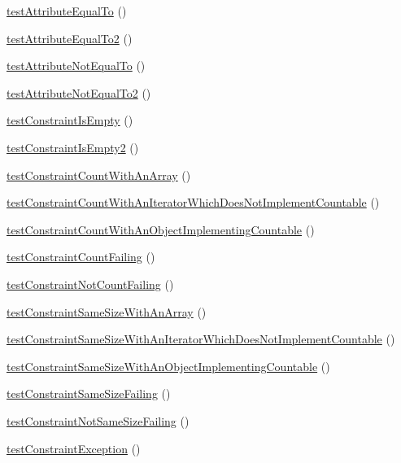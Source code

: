 \begin{DoxyCompactItemize}
\mbox{\hyperlink{class_framework___constraint_test_abf452e33aa93de00c9b9281c2d311656}{test\+Attribute\+Equal\+To}} ()
\item 
\mbox{\hyperlink{class_framework___constraint_test_a63db5364eb96b4d22b7770f102070f93}{test\+Attribute\+Equal\+To2}} ()
\item 
\mbox{\hyperlink{class_framework___constraint_test_a489daffc2853b460aa4ddd7de8d5f570}{test\+Attribute\+Not\+Equal\+To}} ()
\item 
\mbox{\hyperlink{class_framework___constraint_test_a6cd69ee32a47cdb697f4b62ee9c960b9}{test\+Attribute\+Not\+Equal\+To2}} ()
\item 
\mbox{\hyperlink{class_framework___constraint_test_a72f83de1d27d174cc64848bcd7b6faf8}{test\+Constraint\+Is\+Empty}} ()
\item 
\mbox{\hyperlink{class_framework___constraint_test_a33d319a3d601f2fa07aa62ba289a3c58}{test\+Constraint\+Is\+Empty2}} ()
\item 
\mbox{\hyperlink{class_framework___constraint_test_a845d5a686b4c306c8569406512e7435d}{test\+Constraint\+Count\+With\+An\+Array}} ()
\item 
\mbox{\hyperlink{class_framework___constraint_test_ad0110cfdbdb295a06bd17e03a19cdfbe}{test\+Constraint\+Count\+With\+An\+Iterator\+Which\+Does\+Not\+Implement\+Countable}} ()
\item 
\mbox{\hyperlink{class_framework___constraint_test_ae8ae587ffa667693a490a5381177a865}{test\+Constraint\+Count\+With\+An\+Object\+Implementing\+Countable}} ()
\item 
\mbox{\hyperlink{class_framework___constraint_test_a2294db41e1291b5f74e7fb69b70a0676}{test\+Constraint\+Count\+Failing}} ()
\item 
\mbox{\hyperlink{class_framework___constraint_test_a03ac08ceecc4482260224a86975f9138}{test\+Constraint\+Not\+Count\+Failing}} ()
\item 
\mbox{\hyperlink{class_framework___constraint_test_a9e5749ceb480adeedd22944f7f17c7e1}{test\+Constraint\+Same\+Size\+With\+An\+Array}} ()
\item 
\mbox{\hyperlink{class_framework___constraint_test_a0a4221f9e53057258fac74866f1e98d6}{test\+Constraint\+Same\+Size\+With\+An\+Iterator\+Which\+Does\+Not\+Implement\+Countable}} ()
\item 
\mbox{\hyperlink{class_framework___constraint_test_a2cd59e1450007418bf66076342d14201}{test\+Constraint\+Same\+Size\+With\+An\+Object\+Implementing\+Countable}} ()
\item 
\mbox{\hyperlink{class_framework___constraint_test_a9054b02828d1ccd74203a61c094cc3c1}{test\+Constraint\+Same\+Size\+Failing}} ()
\item 
\mbox{\hyperlink{class_framework___constraint_test_a25e56767ab71027dd09b2952c89bcd80}{test\+Constraint\+Not\+Same\+Size\+Failing}} ()
\item 
\mbox{\hyperlink{class_framework___constraint_test_a9d50121b106a0c4e35d5d122133b731f}{test\+Constraint\+Exception}} ()
\end{DoxyCompactItemize}
